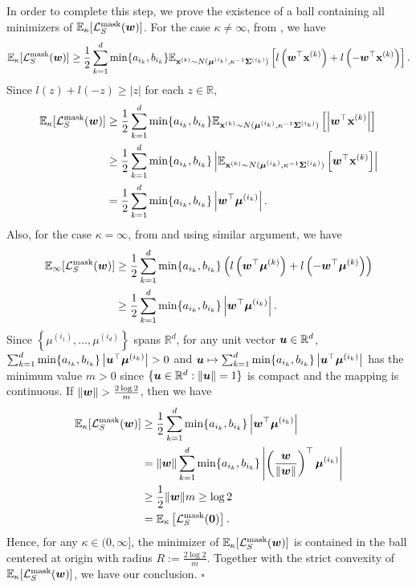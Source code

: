 In order to complete this step, we prove the existence of a ball containing all minimizers of $\mathbb{E}_\kappa[\mathcal{L}_S^\mathrm{mask}({\bm{w}})]$. For the case $\kappa \neq \infty$, from , we have
\begin{equation*}
    \mathbb{E}_\kappa[\mathcal{L}_S^\mathrm{mask}({\bm{w}})] \geq \frac{1}{2}\sum_{k=1}^d \min\{a_{i_k}, b_{i_k}\} \mathbb{E}_{{\mathbf{x}}^{(k)} \sim N({\bm{\mu}}^{(i_k)},\kappa^{-1} {\bm{\Sigma}}^{(i_k)})} \left[l\left({\bm{w}}^\top {\mathbf{x}}^{(k)}\right) + l\left(-{\bm{w}}^\top {\mathbf{x}}^{(k)}\right)\right].
\end{equation*}
Since $l(z) + l(-z) \geq |z|$ for each $z \in \mathbb{R}$,
\begin{align*}
    \mathbb{E}_\kappa[\mathcal{L}_S^\mathrm{mask}({\bm{w}})] &\geq \frac{1}{2}\sum_{k=1}^d \min\{a_{i_k},b_{i_k}\} \mathbb{E}_{{\mathbf{x}}^{(k)} \sim N({\bm{\mu}}^{(i_k)}, \kappa^{-1} {\bm{\Sigma}}^{(i_k)})}\left[\left|{\bm{w}}^\top {\mathbf{x}}^{(k)}\right|\right] \\
    &\geq \frac{1}{2}\sum_{k=1}^d \min\{a_{i_k}, b_{i_k}\} \left|\mathbb{E}_{{\mathbf{x}}^{(k)} \sim N({\bm{\mu}}^{(i_k)}, \kappa^{-1} {\bm{\Sigma}}^{(i_k)})} \left[{\bm{w}}^\top {\mathbf{x}}^{(k)}\right]\right|\\
    &= \frac{1}{2}\sum_{k=1}^d \min\{a_{i_k}, b_{i_k}\} \left|{\bm{w}}^\top {\bm{\mu}}^{(i_k)}\right|.
\end{align*}
Also, for the case $\kappa = \infty$, from  and using similar argument, we have
\begin{align*}
    \mathbb{E}_\infty[\mathcal{L}_S^\mathrm{mask}({\bm{w}})] 
    &\geq \frac{1}{2} \sum_{k=1}^d \min\{a_{i_k}, b_{i_k}\} \left(l\left({\bm{w}}^\top {\bm{\mu}}^{(k)}\right) + l\left(-{\bm{w}}^\top {\bm{\mu}}^{(k)}\right)\right)\\
    &\geq \frac{1}{2}\sum_{k=1}^d \min\{a_{i_k},b_{i_k}\} \left|{\bm{w}}^\top {\bm{\mu}}^{(i_k)}\right|.
\end{align*}
Since $\left\{\mu^{(i_1)}, \dots, \mu^{(i_d)}\right\}$ spans $\mathbb{R}^d$, for any unit vector ${\bm{u}} \in \mathbb{R}^d$, $\sum_{k=1}^d \min\{a_{i_k},  b_{i_k}\} \left|{\bm{u}}^\top {\bm{\mu}}^{(i_k)}\right| >0$ and ${\bm{u}} \mapsto \sum_{k=1}^d \min\{a_{i_k},  b_{i_k}\} \left|{\bm{u}}^\top {\bm{\mu}}^{(i_k)}\right|$ has the minimum value $m>0$ since $\{ {\bm{u}} \in \mathbb{R}^d : \lVert {\bm{u}} \rVert =1 \}$ is compact and the mapping is continuous. If $\lVert {\bm{w}} \rVert > \frac{2\log 2}{m}$, then we have
\begin{align*}
    \mathbb{E}_\kappa[\mathcal{L}_S^\mathrm{mask}({\bm{w}})]  &\geq \frac{1}{2} \sum_{k=1}^d \min\{a_{i_k},  b_{i_k}\} \left|{\bm{w}}^\top {\bm{\mu}}^{(i_k)}\right|\\ 
    &= \lVert {\bm{w}} \rVert \sum_{k=1}^d \min\{a_{i_k},  b_{i_k}\} \left|\left(\frac{{\bm{w}}}{\lVert {\bm{w}} \rVert}\right)^\top {\bm{\mu}}^{(i_k)}\right|\\ 
    &\geq \frac{1}{2}\lVert {\bm{w}} \rVert m \geq \log 2\\
    &= \mathbb{E}_\kappa\left[\mathcal{L}_S^\mathrm{mask}({\bm{0}})\right].
\end{align*}
Hence, for any $\kappa \in (0,\infty]$, the minimizer of $\mathbb{E}_\kappa[\mathcal{L}_S^\mathrm{mask}({\bm{w}})]$ is contained in the ball centered at origin with radius $R:=\frac{2 \log 2}{m}$. Together with the strict convexity of $\mathbb{E}_{\kappa}[\mathcal{L}_S^\mathrm{mask} ({\bm{w}})]$, we have our conclusion. \hfill $\square$

